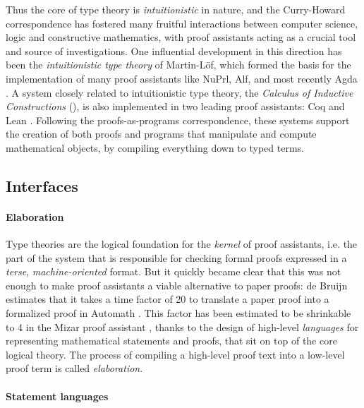 Thus the core of type theory is \emph{intuitionistic} in nature, and the
Curry-Howard correspondence has fostered many fruitful interactions between
computer science, logic and constructive mathematics, with proof assistants
acting as a crucial tool and source of investigations. One influential
development in this direction has been the \emph{intuitionistic type theory} of
Martin-Löf, which formed the basis for the implementation of many proof
assistants like NuPrl, Alf, and most recently Agda \cite{geuvers_proof_2009}. A
system closely related to intuitionistic type theory, the \emph{Calculus of
Inductive Constructions} (), is also implemented in two leading proof
assistants: Coq  and Lean
. Following the proofs-as-programs
correspondence, these systems support the creation of both proofs and programs
that manipulate and compute mathematical objects, by compiling everything down
to typed terms.

\subsection{Interfaces}

\paragraph{Elaboration}

Type theories are the logical foundation for the \emph{kernel} of proof
assistants, i.e. the part of the system that is responsible for checking formal
proofs expressed in a \emph{terse}, \emph{machine-oriented} format. But it
quickly became clear that this was not enough to make proof assistants a viable
alternative to paper proofs: de Bruijn estimates that it takes a time factor of
20 to translate a paper proof into a formalized proof in Automath
. This factor has been estimated to
be shrinkable to 4 in the Mizar proof assistant ,
thanks to the design of high-level \emph{languages} for representing
mathematical statements and proofs, that sit on top of the core logical
theory. The
process of compiling a high-level proof text into a low-level proof term is
called \emph{elaboration}.

\paragraph{Statement languages}

